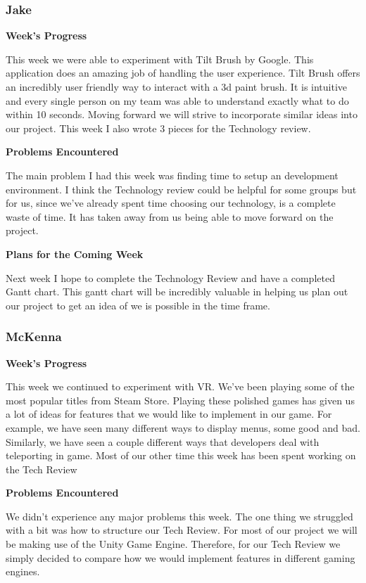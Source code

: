 \documentclass[10pt,journal,compsoc,onecolumn, draftclsnofoot]{IEEEtran}
\begin{document}
\subsubsection{Jake}
\noindent \textbf{Week's Progress}

This week we were able to experiment with Tilt Brush by Google. This application does an amazing job of handling the user experience. Tilt Brush offers an incredibly user friendly way to interact with a 3d paint brush. It is intuitive and every single person on my team was able to understand exactly what to do within 10 seconds. Moving forward we will strive to incorporate similar ideas into our project. This week I also wrote 3 pieces for the Technology review.

\noindent \textbf{Problems Encountered}

The main problem I had this week was finding time to setup an development environment. I think the Technology review could be helpful for some groups but for us, since we've already spent time choosing our technology, is a complete waste of time. It has taken away from us being able to move forward on the project.

\noindent \textbf{Plans for the Coming Week}

Next week I hope to complete the Technology Review and have a completed Gantt chart. This gantt chart will be incredibly valuable in helping us plan out our project to get an idea of we is possible in the time frame.

\subsubsection{McKenna}
\noindent \textbf{Week's Progress}

This week we continued to experiment with VR. We've been playing some of the most popular titles from Steam Store. Playing these polished games has given us a lot of ideas for features that we would like to implement in our game. For example, we have seen many different ways to display menus, some good and bad. Similarly, we have seen a couple different ways that developers deal with teleporting in game. Most of our other time this week has been spent working on the Tech Review

\noindent \textbf{Problems Encountered}

We didn't experience any major problems this week. The one thing we struggled with a bit was how to structure our Tech Review. For most of our project we will be making use of the Unity Game Engine. Therefore, for our Tech Review we simply decided to compare how we would implement features in different gaming engines.
\end{document}
